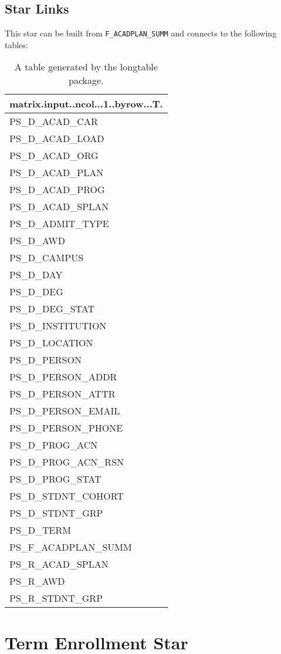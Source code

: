 \documentclass[
]{book}
\begin{document}
\hypertarget{star-links}{%
\section{Star Links}\label{star-links}}

This star can be built from \texttt{F\_ACADPLAN\_SUMM} and connects to the following tables:

\begin{longtable}[t]{l}
\caption{\label{tab:table-data}A table generated by the longtable package.}\\
\toprule
matrix.input..ncol...1..byrow...T.\\
\midrule
PS\_D\_ACAD\_CAR\\
PS\_D\_ACAD\_LOAD\\
PS\_D\_ACAD\_ORG\\
PS\_D\_ACAD\_PLAN\\
PS\_D\_ACAD\_PROG\\
\addlinespace
PS\_D\_ACAD\_SPLAN\\
PS\_D\_ADMIT\_TYPE\\
PS\_D\_AWD\\
PS\_D\_CAMPUS\\
PS\_D\_DAY\\
\addlinespace
PS\_D\_DEG\\
PS\_D\_DEG\_STAT\\
PS\_D\_INSTITUTION\\
PS\_D\_LOCATION\\
PS\_D\_PERSON\\
\addlinespace
PS\_D\_PERSON\_ADDR\\
PS\_D\_PERSON\_ATTR\\
PS\_D\_PERSON\_EMAIL\\
PS\_D\_PERSON\_PHONE\\
PS\_D\_PROG\_ACN\\
\addlinespace
PS\_D\_PROG\_ACN\_RSN\\
PS\_D\_PROG\_STAT\\
PS\_D\_STDNT\_COHORT\\
PS\_D\_STDNT\_GRP\\
PS\_D\_TERM\\
\addlinespace
PS\_F\_ACADPLAN\_SUMM\\
PS\_R\_ACAD\_SPLAN\\
PS\_R\_AWD\\
PS\_R\_STDNT\_GRP\\
\bottomrule
\end{longtable}

\hypertarget{term-enrollment-star}{%
\chapter{Term Enrollment Star}\label{term-enrollment-star}}
\end{document}
